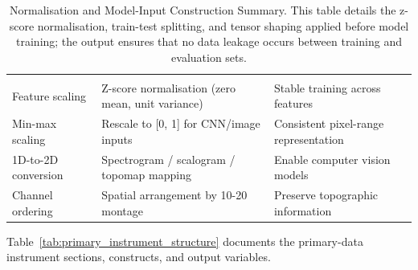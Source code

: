 {\tablestripes\tablefontsize
\begin{xltabular}{\textwidth}{@{} l L L @{}}
\caption[Normalisation and Model-Input Construction Summary]{Normalisation and Model-Input Construction Summary. This table details the z-score normalisation, train-test splitting, and tensor shaping applied before model training; the output ensures that no data leakage occurs between training and evaluation sets.}\label{tab:normalization_summary} \\
\toprule
{} &  &  \\
\midrule
\endfirsthead
\toprule
{} &  &  \\
\midrule
\endhead
\bottomrule
\endlastfoot
Feature scaling & Z-score normalisation (zero mean, unit variance) & Stable training across features \\
Min-max scaling & Rescale to [0, 1] for CNN/image inputs & Consistent pixel-range representation \\
1D-to-2D conversion & Spectrogram / scalogram / topomap mapping & Enable computer vision models \\
Channel ordering & Spatial arrangement by 10-20 montage & Preserve topographic information \\
\end{xltabular}}
\fi %

\noindent Table~\ref{tab:primary_instrument_structure} documents the primary-data instrument sections, constructs, and output variables.

\iffalse %

